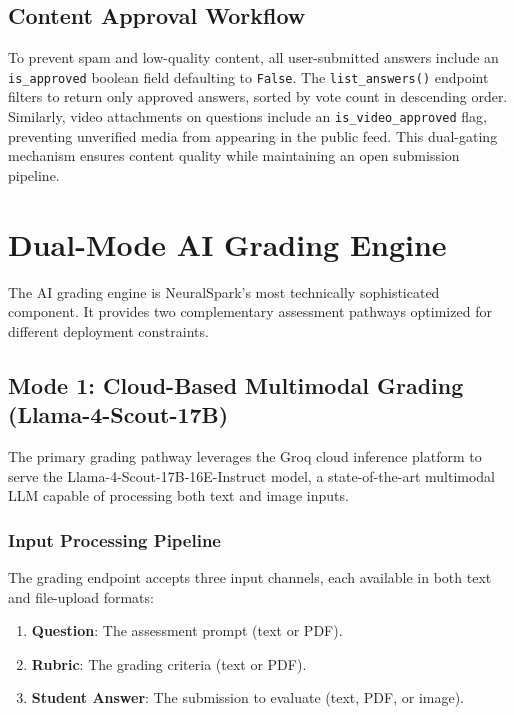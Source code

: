 \documentclass[conference]{IEEEtran}
\begin{document}
\subsection{Content Approval Workflow}
To prevent spam and low-quality content, all user-submitted answers include an \texttt{is\_approved} boolean field defaulting to \texttt{False}. The \texttt{list\_answers()} endpoint filters to return only approved answers, sorted by vote count in descending order. Similarly, video attachments on questions include an \texttt{is\_video\_approved} flag, preventing unverified media from appearing in the public feed. This dual-gating mechanism ensures content quality while maintaining an open submission pipeline.

\section{Dual-Mode AI Grading Engine}
The AI grading engine is NeuralSpark's most technically sophisticated component. It provides two complementary assessment pathways optimized for different deployment constraints.

\subsection{Mode 1: Cloud-Based Multimodal Grading (Llama-4-Scout-17B)}
The primary grading pathway leverages the Groq cloud inference platform to serve the Llama-4-Scout-17B-16E-Instruct model, a state-of-the-art multimodal LLM capable of processing both text and image inputs.

\subsubsection{Input Processing Pipeline}
The grading endpoint accepts three input channels, each available in both text and file-upload formats:
\begin{enumerate}[leftmargin=*]
    \item \textbf{Question}: The assessment prompt (text or PDF).
    \item \textbf{Rubric}: The grading criteria (text or PDF).
    \item \textbf{Student Answer}: The submission to evaluate (text, PDF, or image).
\end{enumerate}
\end{document}
